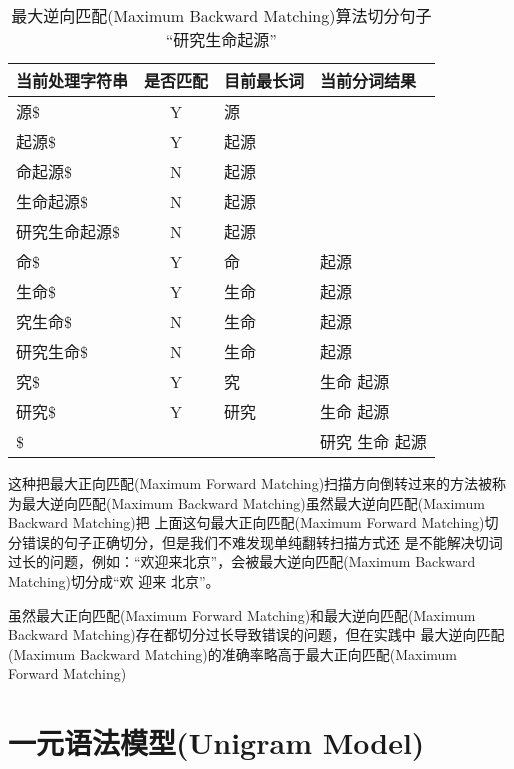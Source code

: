 \documentclass[12pt,a4paper]{article}
\def\maxforward{最大正向匹配(Maximum Forward Matching)}
\def\maxbackward{最大逆向匹配(Maximum Backward Matching)}
\def\UniGram{一元语法模型(Unigram Model)}
\begin{document}
\begin{table}
\caption{\maxbackward 算法切分句子 “研究生命起源”}
\label{tbl_maxbackward}
	\begin{center}
		\begin{tabular}{l|c|l|l}
			当前处理字符串           & 是否匹配 & 目前最长词 & 当前分词结果   \\
			\hline
			源\$                     &  Y  & 源         &                \\
			起源\$                   &  Y  & 起源       &                \\
			命起源\$                 &  N  & 起源       &                \\
			生命起源\$               &  N  & 起源       &                \\
			研究生命起源\$           &  N  & 起源       &                \\

			命\$                     &  Y  & 命         & 起源           \\
			生命\$                   &  Y  & 生命       & 起源           \\
			究生命\$                 &  N  & 生命       & 起源           \\
			研究生命\$               &  N  & 生命       & 起源           \\

			究\$                     &  Y  & 究         & 生命 起源      \\
			研究\$                   &  Y  & 研究       & 生命 起源      \\

			\$                       &          &            & 研究 生命 起源 \\
		\end{tabular}
	\end{center}
\end{table}

这种把\maxforward 扫描方向倒转过来的方法被称为\maxbackward 虽然\maxbackward 把
上面这句\maxforward 切分错误的句子正确切分，但是我们不难发现单纯翻转扫描方式还
是不能解决切词过长的问题，例如：“欢迎来北京”，会被\maxbackward 切分成“欢 迎来 北京”。

虽然\maxforward 和\maxbackward 存在都切分过长导致错误的问题，但在实践中
\maxbackward 的准确率略高于\maxforward

\section{\UniGram}
\end{document}
